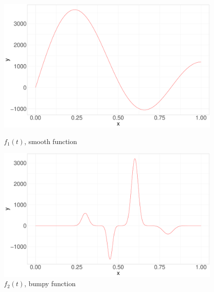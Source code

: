 \documentclass[11pt,twoside,a4paper]{article}
\begin{document}
		\begin{figure}
			\centering
			\begin{minipage}{.5\textwidth}
				\centering
  				\includegraphics[width=\textwidth]{../Graphics/f1_plot.pdf}
  				\caption{$f_1(t)$, smooth function}
  				\label{fig:test1}
			\end{minipage}%
			\begin{minipage}{.5\textwidth}
	  			\centering
  				\includegraphics[width=\textwidth]{../Graphics/f2_plot.pdf}
  				\caption{$f_2(t)$, bumpy function}
  				\label{fig:test2}
			\end{minipage}
		\end{figure}
		
\end{document}
